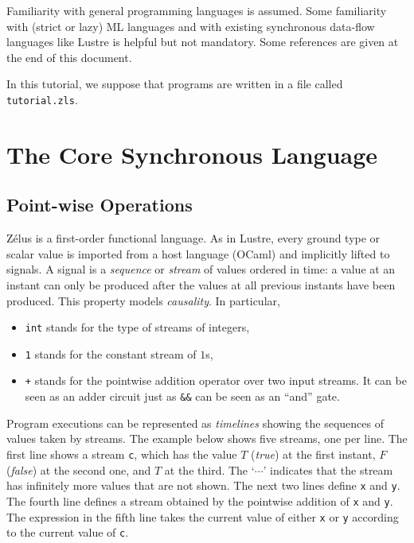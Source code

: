 \documentclass[11pt,titlepage,twoside]{report}
\makeatletter
\newcommand{\zls}[1]{{\@span{class="zelusinline"}#1}}
\newcommand{\zls}[1]{\texttt{#1}}
\renewcommand{\zls}[1]{\texttt{#1}}
\newcommand{\f}{$F$}
\renewcommand{\t}{$T$}
\newcommand{\zelus}{{\sf Z\'elus}}
\newcommand{\lustre}{{\sf Lustre}}
\newcommand{\ocaml}{{\sf OCaml}}
\makeatother
\begin{document}
Familiarity with general programming languages is assumed.
Some familiarity with (strict or lazy) ML
languages and with existing synchronous data-flow languages like \lustre{} is
helpful but not mandatory. Some references are given at the end of this document.

In this tutorial, we suppose that programs are written in a file called
\verb-tutorial.zls-.%

\section{The Core Synchronous Language\label{coresync}} %

\subsection{Point-wise Operations\label{pointwise}} %

\zelus{} is a first-order functional language. As in \lustre,
every ground type or scalar value is imported from a host language
(\ocaml{}) and implicitly lifted to signals. A signal is a
\emph{sequence} or \emph{stream} of values ordered in time:
a value at an instant can only be produced after the values at all previous 
instants have been produced. This property
models \emph{causality}. In particular,
\begin{itemize}
\item \zls{int} stands for the type of streams of integers,
\item \zls{1} stands for the constant stream of $1$s,
\item \zls{+} stands for the pointwise addition operator over two input 
streams. It can be seen as an adder circuit just as \zls{\&\&} can be seen 
as an ``and'' gate.
\end{itemize}
Program executions can be represented as \emph{timelines} showing the 
sequences of values taken by streams. The
example below shows five streams, one per line. The first line shows
a stream \zls{c}, which has the value \t{} ({\em true}) at the first 
instant, \f{} ({\em false}) at the second one, and \t{} at the
third. The `$\cdots$' indicates that the stream has infinitely more values 
that are not shown. The next two lines define \zls{x} and \zls{y}. The 
fourth line defines a stream obtained
by the pointwise addition of \zls{x} and \zls{y}.
The expression in the fifth line takes the current value of either \zls{x} 
or \zls{y} according to the current value of \zls{c}.
\end{document}
